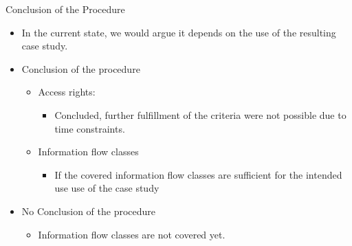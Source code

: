 \documentclass[18pt]{beamer}
\begin{document}
\begin{frame}{Conclusion of the Procedure}
\begin{itemize}
\item In the current state, we would argue it depends on the use of the resulting case study.
\item Conclusion of the procedure
\begin{itemize}
\item Access rights:
\begin{itemize}
\item Concluded, further fulfillment of the criteria were not possible due to time constraints.
\end{itemize}
\item Information flow classes
\begin{itemize}
\item If the covered information flow classes are sufficient for the intended use use of the case study
\end{itemize}
\end{itemize}
\item No Conclusion of the procedure
\begin{itemize}
\item Information flow classes are not covered yet.
\end{itemize}
\end{itemize}
\end{frame}

\backupend
\end{document}
